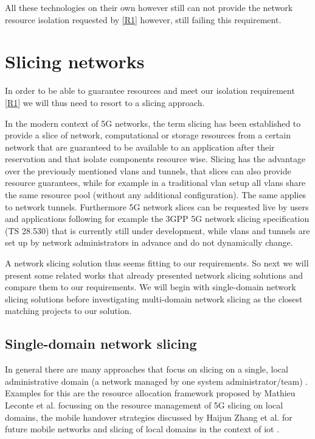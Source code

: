 All these technologies on their own however still can not provide the network resource isolation requested by \ref{R1} however, still failing this requirement.


\section{Slicing networks}
In order to be able to guarantee resources and meet our isolation requirement \ref{R1} we will thus need to resort to a slicing approach.

In the modern context of 5G networks, the term slicing has been established to provide a slice of network, computational or storage resources from a certain network that are guaranteed to be available to an application after their reservation \cite{5G1,5G2,5G3} and that isolate components resource wise. Slicing has the advantage over the previously mentioned \acrshort{vlan}s and tunnels, that slices can also provide resource guarantees, while for example in a traditional \acrshort{vlan} setup all \acrshort{vlan}s share the same resource pool (without any additional configuration). The same applies to network tunnels. Furthermore 5G network slices can be requested live by users and applications following for example the 3GPP 5G network slicing specification (TS 28.530) \cite{3gpp28.530} that is currently still under development, while \acrshort{vlan}s and tunnels are set up by network administrators in advance and do not dynamically change.

A network slicing solution thus seems fitting to our requirements. So next we will present some related works that already presented network slicing solutions and compare them to our requirements. We will begin with single-domain network slicing solutions before investigating multi-domain network slicing as the closest matching projects to our solution.

\subsection{Single-domain network slicing} In general there are many approaches that focus on slicing on a single, local administrative domain (a network managed by one system administrator/team) \cite{SD1,SD2,SD3}. Examples for this are the resource allocation framework proposed by Mathieu Leconte et al. \cite{SD3} focussing on the resource management of 5G slicing on local domains, the mobile handover strategies discussed by Haijun Zhang et al. \cite{SD1} for future mobile networks and slicing of local domains in the context of \acrshort{iot} \cite{SD2}.

